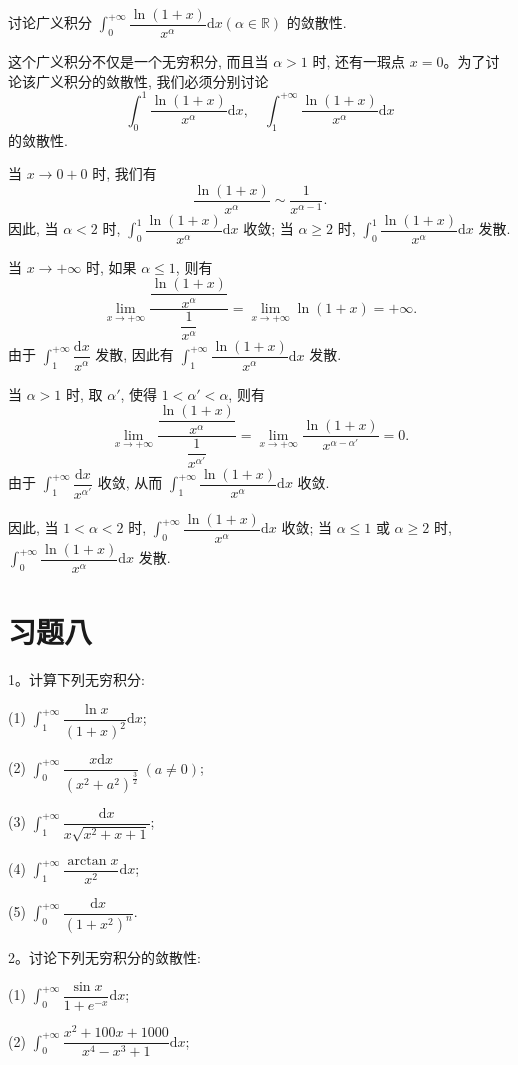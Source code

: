 \begin{example}\label{example:ma-8-3-5}
讨论广义积分 $\int_0^{+\infty}\dfrac{\ln(1+x)}{x^\alpha}\mathrm dx(\alpha\in\mathbb R)$ 的敛散性.
\end{example}


\begin{solve}
这个广义积分不仅是一个无穷积分, 而且当 $\alpha>1$ 时, 还有一瑕点 $x=0$。为了讨论该广义积分的敛散性, 我们必须分别讨论
\[
  \int_0^1\frac{\ln(1+x)}{x^\alpha}\mathrm dx,\quad
  \int_1^{+\infty}\frac{\ln(1+x)}{x^\alpha}\mathrm dx
\]
的敛散性.

当 $x\to0+0$ 时, 我们有
\[
  \frac{\ln(1+x)}{x^\alpha}\sim\frac1{x^{\alpha-1}}.
\]
因此, 当 $\alpha<2$ 时, $\int_0^1\dfrac{\ln(1+x)}{x^\alpha}\mathrm dx$ 收敛; 当 $\alpha\geq2$ 时, $\int_0^1\dfrac{\ln(1+x)}{x^\alpha}\mathrm dx$ 发散.

当 $x\to+\infty$ 时, 如果 $\alpha\leq1$, 则有
\[
  \lim_{x\to+\infty}
  \frac{\dfrac{\ln(1+x)}{x^\alpha}}{\dfrac1{x^\alpha}}
  =
  \lim_{x\to+\infty}\ln(1+x)=+\infty.
\]
由于 $\int_1^{+\infty}\dfrac{\mathrm dx}{x^\alpha}$ 发散, 因此有 $\int_1^{+\infty}\dfrac{\ln(1+x)}{x^\alpha}\mathrm dx$ 发散.

当 $\alpha>1$ 时, 取 $\alpha'$, 使得 $1<\alpha'<\alpha$, 则有
\[
  \lim_{x\to+\infty}
  \frac{\dfrac{\ln(1+x)}{x^\alpha}}{\dfrac1{x^{\alpha'}}}
  =
  \lim_{x\to+\infty}\frac{\ln(1+x)}{x^{\alpha-\alpha'}}=0.
\]
由于 $\int_1^{+\infty}\dfrac{\mathrm dx}{x^{\alpha'}}$ 收敛, 从而 $\int_1^{+\infty}\dfrac{\ln(1+x)}{x^\alpha}\mathrm dx$ 收敛.

因此, 当 $1<\alpha<2$ 时, $\int_0^{+\infty}\dfrac{\ln(1+x)}{x^\alpha}\mathrm dx$ 收敛; 当 $\alpha\leq1$ 或 $\alpha\geq2$ 时, $\int_0^{+\infty}\dfrac{\ln(1+x)}{x^\alpha}\mathrm dx$ 发散.
\end{solve}


\section*{习题八}
{}
\label{exercises:ma-8}

1。计算下列无穷积分:

(1) $\int_1^{+\infty}\dfrac{\ln x}{(1+x)^2}\mathrm dx$;

(2) $\int_0^{+\infty}\dfrac{x\mathrm dx}{(x^2+a^2)^{\frac32}}\ (a\ne0)$;

(3) $\int_1^{+\infty}\dfrac{\mathrm dx}{x\sqrt{x^2+x+1}}$;

(4) $\int_1^{+\infty}\dfrac{\arctan x}{x^2}\mathrm dx$;

(5) $\int_0^{+\infty}\dfrac{\mathrm dx}{(1+x^2)^n}$.

2。讨论下列无穷积分的敛散性:

(1) $\int_0^{+\infty}\dfrac{\sin x}{1+e^{-x}}\mathrm dx$;

(2) $\int_0^{+\infty}\dfrac{x^2+100x+1000}{x^4-x^3+1}\mathrm dx$;

